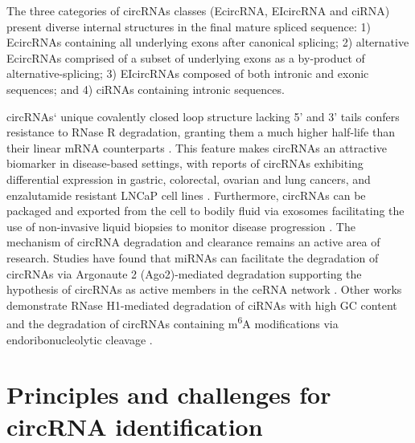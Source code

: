 \documentclass[journal,review,submit,pdftex,moreauthors]{Definitions/mdpi}
\begin{document}
The three categories of circRNAs classes (EcircRNA, EIcircRNA and ciRNA) present diverse internal structures in the final mature spliced sequence: 1) EcircRNAs containing all underlying exons after canonical splicing; 2) alternative EcircRNAs comprised of a subset of underlying exons as a by-product of alternative-splicing; 3) EIcircRNAs composed of both intronic and exonic sequences; and 4) ciRNAs containing intronic sequences. \par

circRNAs` unique covalently closed loop structure lacking 5' and 3' tails confers resistance to RNase R degradation, granting them a much higher half-life than their linear mRNA counterparts \cite{Suzuki2006May, Enuka2016Feb}. This feature makes circRNAs an attractive biomarker in disease-based settings, with reports of circRNAs exhibiting differential expression in gastric, colorectal, ovarian and lung cancers, and enzalutamide resistant LNCaP cell lines \cite{Li2015Apr, Bachmayr-Heyda2015, Lim2021Dec}. Furthermore, circRNAs can be packaged and exported from the cell to bodily fluid via exosomes \cite{Li2015Aug, Shi2020Mar} facilitating the use of non-invasive liquid biopsies to monitor disease progression \cite{Wang2019Feb, Wu2023Apr, Pan2019Nov, Li2020Mar, Chen2020Apr, Louis2019Nov}. The mechanism of circRNA degradation and clearance remains an active area of research. Studies have found that miRNAs can facilitate the degradation of circRNAs via Argonaute 2 (Ago2)-mediated degradation supporting the hypothesis of circRNAs as active members in the ceRNA network \cite{Hansen2011Sep}. Other works demonstrate RNase H1-mediated degradation of ciRNAs with high GC content \cite{Li2021Nov} and the degradation of circRNAs containing m\textsuperscript{6}A modifications via endoribonucleolytic cleavage \cite{Park2019May}. 

\section{Principles and challenges for circRNA identification}
\end{document}
